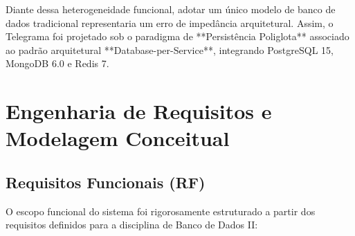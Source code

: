 \documentclass[12pt,a4paper]{report}
\begin{document}
Diante dessa heterogeneidade funcional, adotar um único modelo de banco de dados tradicional representaria um erro de impedância arquitetural. Assim, o Telegrama foi projetado sob o paradigma de **Persistência Poliglota** associado ao padrão arquitetural **Database-per-Service**, integrando PostgreSQL 15, MongoDB 6.0 e Redis 7.

\chapter{Engenharia de Requisitos e Modelagem Conceitual}

\section{Requisitos Funcionais (RF)}
O escopo funcional do sistema foi rigorosamente estruturado a partir dos requisitos definidos para a disciplina de Banco de Dados II:
\end{document}

